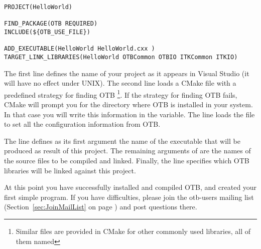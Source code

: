 \small
\begin{verbatim}
PROJECT(HelloWorld)

FIND_PACKAGE(OTB REQUIRED)
INCLUDE(${OTB_USE_FILE})

ADD_EXECUTABLE(HelloWorld HelloWorld.cxx )
TARGET_LINK_LIBRARIES(HelloWorld OTBCommon OTBIO ITKCommon ITKIO)
\end{verbatim}

\normalsize

The first line defines the name of your project as it appears in Visual
Studio (it will have no effect under UNIX). The second line loads a CMake
file with a predefined strategy for finding OTB \footnote{Similar files are
provided in CMake for other commonly used libraries, all of them named
}. If the strategy for finding OTB fails, CMake will prompt
you for the directory where OTB is installed in your system. In that case you
will write this information in the  variable. The line  loads the  file to set
all the configuration information from OTB.


The line 
defines as its first argument the name of the executable that will be produced
as result of this project. The remaining arguments of 
are the names of the source files to be compiled and linked.  Finally, the
 line specifies which OTB libraries will be
linked against this project.




At this point you have successfully installed and compiled OTB, and created
your first simple program. If you have difficulties, please join the
otb-users mailing list (Section~\ref{sec:JoinMailList} on page
\pageref{sec:JoinMailList}) and post questions there.

